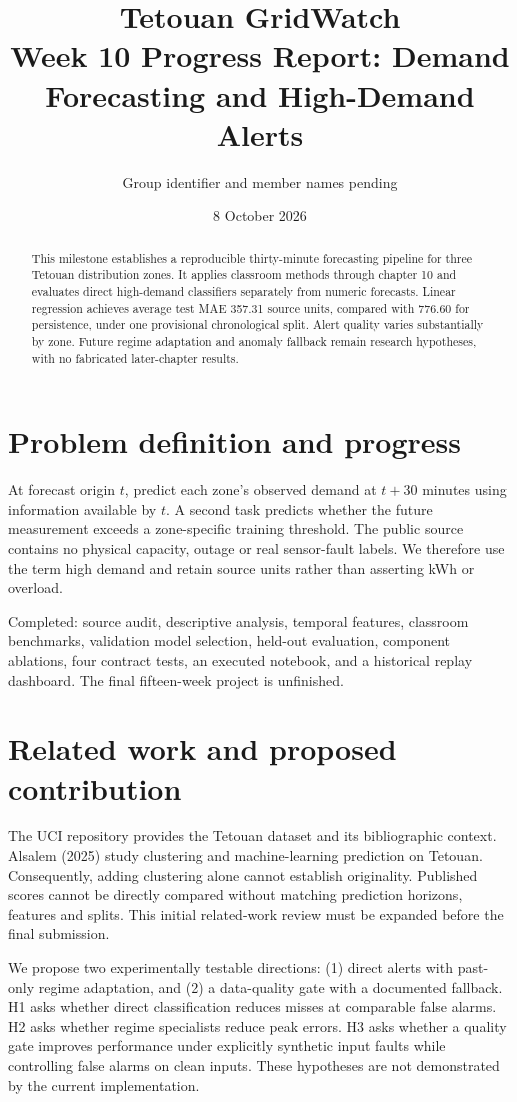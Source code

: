 \documentclass[11pt,a4paper]{article}
\title{Tetouan GridWatch\\\large Week 10 Progress Report: Demand Forecasting and High-Demand Alerts}
\author{Group identifier and member names pending}
\date{8 October 2026}
\begin{document}
\maketitle
\begin{abstract}
This milestone establishes a reproducible thirty-minute forecasting pipeline for three Tetouan distribution zones. It applies classroom methods through chapter 10 and evaluates direct high-demand classifiers separately from numeric forecasts. Linear regression achieves average test MAE 357.31 source units, compared with 776.60 for persistence, under one provisional chronological split. Alert quality varies substantially by zone. Future regime adaptation and anomaly fallback remain research hypotheses, with no fabricated later-chapter results.
\end{abstract}

\section{Problem definition and progress}
At forecast origin $t$, predict each zone's observed demand at $t+30$ minutes using information available by $t$. A second task predicts whether the future measurement exceeds a zone-specific training threshold. The public source contains no physical capacity, outage or real sensor-fault labels. We therefore use the term high demand and retain source units rather than asserting kWh or overload.

Completed: source audit, descriptive analysis, temporal features, classroom benchmarks, validation model selection, held-out evaluation, component ablations, four contract tests, an executed notebook, and a historical replay dashboard. The final fifteen-week project is unfinished.

\section{Related work and proposed contribution}
The UCI repository provides the Tetouan dataset and its bibliographic context. Alsalem (2025) study clustering and machine-learning prediction on Tetouan. Consequently, adding clustering alone cannot establish originality. Published scores cannot be directly compared without matching prediction horizons, features and splits. This initial related-work review must be expanded before the final submission.

We propose two experimentally testable directions: (1) direct alerts with past-only regime adaptation, and (2) a data-quality gate with a documented fallback. H1 asks whether direct classification reduces misses at comparable false alarms. H2 asks whether regime specialists reduce peak errors. H3 asks whether a quality gate improves performance under explicitly synthetic input faults while controlling false alarms on clean inputs. These hypotheses are not demonstrated by the current implementation.
\end{document}
